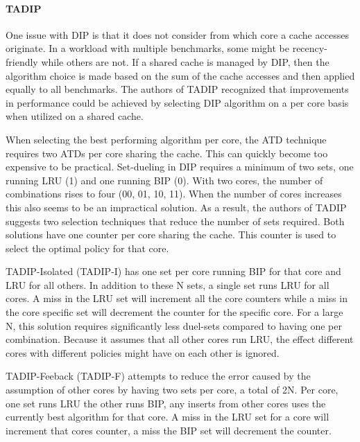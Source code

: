 \paragraph{TADIP}

One issue with DIP is that it does not consider from which core a cache accesses originate.
In a workload with multiple benchmarks, some might be recency-friendly while others are not. 
If a shared cache is managed by DIP, then the algorithm choice is made based on the sum of the cache accesses and then applied equally to all benchmarks.
The authors of TADIP recognized that improvements in performance could be achieved by selecting DIP algorithm on a per core basis when utilized on a shared cache.

When selecting the best performing algorithm per core, the ATD technique requires two ATDs per core sharing the cache. 
This can quickly become too expensive to be practical.
Set-dueling in DIP requires a minimum of two sets, one running LRU (1) and one running BIP (0). 
With two cores, the number of combinations rises to four (00, 01, 10, 11).
When the number of cores increases this also seems to be an impractical solution.
As a result, the authors of TADIP suggests two selection techniques that reduce the number of sets required. 
Both solutions have one counter per core sharing the cache.
This counter is used to select the optimal policy for that core.

TADIP-Isolated (TADIP-I) has one set per core running BIP for that core and LRU for all others.
In addition to these N sets, a single set runs LRU for all cores. 
A miss in the LRU set will increment all the core counters while a miss in the core specific set will decrement the counter for the specific core.
For a large N, this solution requires significantly less duel-sets compared to having one per combination. 
Because it assumes that all other cores run LRU, the effect different cores with different policies might have on each other is ignored.

TADIP-Feeback (TADIP-F) attempts to reduce the error caused by the assumption of other cores by having two sets per core, a total of 2N.
Per core, one set runs LRU the other runs BIP, any inserts from other cores uses the currently best algorithm for that core.
A miss in the LRU set for a core will increment that cores counter, a miss the BIP set will decrement the counter.


